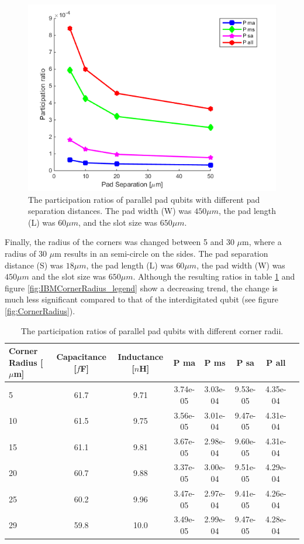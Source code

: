  \begin{figure}
 	\centering
 	\includegraphics[scale = 0.7]{Figures/Ratio_plots/IBMPadSep_legend}
 	\caption{The participation ratios of parallel pad qubits with different pad separation distances. The pad width (W) was \(450 \mu m\), the pad length (L) was \(60 \mu m\), and the slot size was \(650 \mu m\).}
 	\label{fig:IBMPadSep_legend}
 \end{figure}
 
 Finally, the radius of the corners was changed between 5 and 30 \(\mu\)m, where a radius of 30 \(\mu\)m results in an semi-circle on the sides. The pad separation distance (S) was \(18 \mu m\), the pad length (L) was \(60 \mu m\), the pad width (W) was \(450 \mu m\) and the slot size was \(650 \mu m\). Although the resulting ratios in table \ref{table:IBMCornerRadius} and figure \ref{fig:IBMCornerRadius_legend} show a decreasing trend, the change is much less significant compared to that of the interdigitated qubit (see figure \ref{fig:CornerRadius}).
 
 \begin{table}
 	\begin{center}
 		\begin{tabular}{ | l || c | c || c | c | c | c | c |}
 			\hline
 			Corner Radius [\(\mu\)m] & Capacitance [\(f\)F] & Inductance [\(n\)H]  & P ma & P ms & P sa & P all \\ \hline
 			5 & 61.7 & 9.71 & 3.74e-05 & 3.03e-04 & 9.53e-05 & 4.35e-04 \\
 			10 & 61.5 & 9.75 & 3.56e-05 & 3.01e-04 & 9.47e-05 & 4.31e-04 \\
 			15 & 61.1 & 9.81 & 3.67e-05 & 2.98e-04 & 9.60e-05 & 4.31e-04 \\
 			20 & 60.7 & 9.88 & 3.37e-05 & 3.00e-04 & 9.51e-05 & 4.29e-04 \\
 			25 & 60.2 & 9.96 & 3.47e-05 & 2.97e-04 & 9.41e-05 & 4.26e-04 \\
 			29 & 59.8 & 10.0 & 3.49e-05 & 2.99e-04 & 9.47e-05 & 4.28e-04 \\
 			\hline
 		\end{tabular}
 	\end{center}
 	\caption{The participation ratios of parallel pad qubits with different corner radii.}
 	\label{table:IBMCornerRadius}
 \end{table}
 
